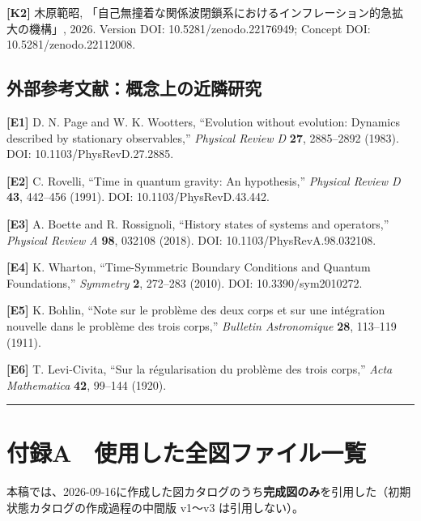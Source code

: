 \documentclass[
  a4paper,
]{ltjsarticle}
\begin{document}
\textbf{{[}K2{]}} 木原範昭,
「自己無撞着な関係波閉鎖系におけるインフレーション的急拡大の機構」,
2026. Version DOI: 10.5281/zenodo.22176949; Concept DOI:
10.5281/zenodo.22112008.

\subsection{外部参考文献：概念上の近隣研究}\label{ux5916ux90e8ux53c2ux8003ux6587ux732eux6982ux5ff5ux4e0aux306eux8fd1ux96a3ux7814ux7a76}

\textbf{{[}E1{]}} D. N. Page and W. K. Wootters, ``Evolution without
evolution: Dynamics described by stationary observables,''
\emph{Physical Review D} \textbf{27}, 2885--2892 (1983). DOI:
10.1103/PhysRevD.27.2885.

\textbf{{[}E2{]}} C. Rovelli, ``Time in quantum gravity: An
hypothesis,'' \emph{Physical Review D} \textbf{43}, 442--456 (1991).
DOI: 10.1103/PhysRevD.43.442.

\textbf{{[}E3{]}} A. Boette and R. Rossignoli, ``History states of
systems and operators,'' \emph{Physical Review A} \textbf{98}, 032108
(2018). DOI: 10.1103/PhysRevA.98.032108.

\textbf{{[}E4{]}} K. Wharton, ``Time-Symmetric Boundary Conditions and
Quantum Foundations,'' \emph{Symmetry} \textbf{2}, 272--283 (2010). DOI:
10.3390/sym2010272.

\textbf{{[}E5{]}} K. Bohlin, ``Note sur le problème des deux corps et
sur une intégration nouvelle dans le problème des trois corps,''
\emph{Bulletin Astronomique} \textbf{28}, 113--119 (1911).

\textbf{{[}E6{]}} T. Levi-Civita, ``Sur la régularisation du problème
des trois corps,'' \emph{Acta Mathematica} \textbf{42}, 99--144 (1920).

\begin{center}\rule{0.5\linewidth}{0.5pt}\end{center}

\section{付録A　使用した全図ファイル一覧}\label{ux4ed8ux9332a-ux4f7fux7528ux3057ux305fux5168ux56f3ux30d5ux30a1ux30a4ux30ebux4e00ux89a7}

本稿では、2026-09-16に作成した図カタログのうち\textbf{完成図のみ}を引用した（初期状態カタログの作成過程の中間版
v1〜v3 は引用しない）。
\end{document}
